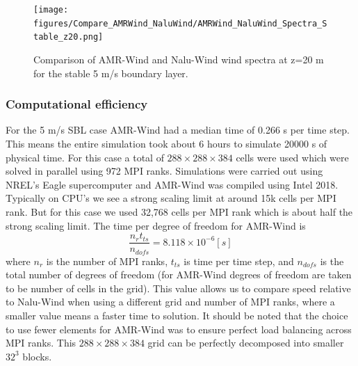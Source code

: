 \begin{figure} %
  \centering
  \texttt{[image: figures/Compare\_AMRWind\_NaluWind/AMRWind\_NaluWind\_Spectra\_Stable\_z20.png]}

  \caption{\label{fig:CompareAMRvsNaluSpectra} Comparison of AMR-Wind
    and Nalu-Wind wind spectra at z=20 m for the stable 5 m/s boundary
    layer. }
\end{figure}




\subsubsection{Computational efficiency}

For the 5 m/s SBL case AMR-Wind had a median time of 0.266 s per time step.
This means the entire simulation took about 6 hours to simulate 20000 s
of physical time. For this case a total of $288\times 288 \times 384$ cells were used
which were solved in parallel using 972 MPI ranks. Simulations were carried out using NREL's
Eagle supercomputer and AMR-Wind was compiled using Intel 2018.
Typically on CPU's we see a strong scaling limit at around 15k cells per MPI rank.
But for this case we used 32,768 cells per MPI rank which is about half the strong scaling limit.
The time per degree of freedom for AMR-Wind is
\[\frac{n_r t_{ts} }{n_{dofs}} = 8.118\times10^{-6} [s]\]
where $n_r$ is the number of MPI ranks, $t_{ts}$ is time per time step, and $n_{dofs}$ is
the total number of degrees of freedom (for AMR-Wind degrees of freedom are taken to be
 number of cells in the grid). This value allows us to compare speed relative to
Nalu-Wind when using a different grid and number of MPI ranks, where a smaller value
means a faster time to solution. It should be noted that the choice to use fewer
elements for AMR-Wind was to ensure perfect load balancing across MPI ranks. This
$288 \times 288 \times 384$ grid can be perfectly decomposed into smaller $32^3$ blocks.

